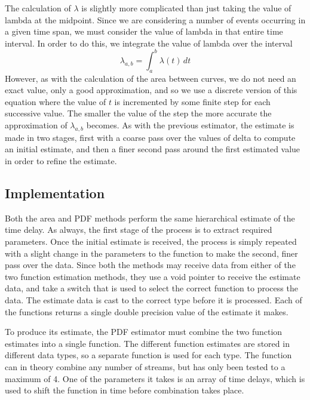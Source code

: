 \documentclass[a4paper,11pt]{article}
\begin{document}
The calculation of $\lambda$ is slightly more complicated than just taking the
value of lambda at the midpoint. Since we are considering a number of events
occurring in a given time span, we must consider the value of lambda in that
entire time interval. In order to do this, we integrate the value of lambda over
the interval
\begin{equation}
\lambda_{a,b}=\int_a^b\lambda(t)\,dt
\end{equation}
However, as with the calculation of the area between curves, we do not need an
exact value, only a good approximation, and so we use a discrete version of this
equation where the value of $t$ is incremented by some finite step for each successive
value. The smaller the value of the step the more accurate the approximation of
$\lambda_{a,b}$ becomes. As with the previous estimator, the estimate is made in
two stages, first with a coarse pass over the values of delta to compute an
initial estimate, and then a finer second pass around the first estimated value
in order to refine the estimate.
\subsection{Implementation}
\label{sec-7-3}

   Both the area and PDF methods perform the same hierarchical estimate of the
   time delay. As always, the first stage of the process is to extract required
   parameters. Once the initial estimate is received, the process is simply
   repeated with a slight change in the parameters to the function to make the
   second, finer pass over the data. Since both the methods may receive data
   from either of the two function estimation methods, they use a void pointer
   to receive the estimate data, and take a switch that is used to select the
   correct function to process the data. The estimate data is cast to the
   correct type before it is processed. Each of the functions returns a single
   double precision value of the estimate it makes.

   To produce its estimate, the PDF estimator must combine the two function
   estimates into a single function. The different function estimates are stored
   in different data types, so a separate function is used for each
   type. The function can in theory combine any number of streams, but has only
   been tested to a maximum of 4. One of the parameters it takes is an array of
   time delays, which is used to shift the function in time before combination
   takes place.
\end{document}
